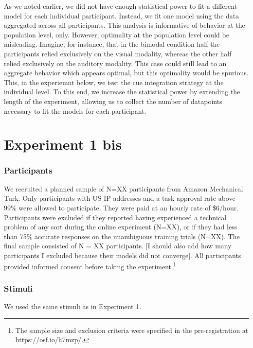 \documentclass[english,,man,floatsintext]{apa6}
\let\rmarkdownfootnote\footnote%
\def\footnote{\protect\rmarkdownfootnote}
\theoremstyle{definition}
\theoremstyle{definition}
\theoremstyle{definition}
\theoremstyle{remark}
\begin{document}
As we noted earlier, we did not have enough statistical power to fit a
different model for each individual participant. Instead, we fit one
model using the data aggregated across all participants. This analysis
is informative of behavior at the population level, only. However,
optimality at the population level could be misleading. Imagine, for
instance, that in the bimodal condition half the participants relied
exclusively on the visual modality, whereas the other half relied
exclusively on the auditory modality. This case could still lead to an
aggregate behavior which appears optimal, but this optimality would be
spurious. This, in the experiemnt below, we test the cue integration
strategy at the individual level. To this end, we increase the
statistical power by extending the length of the experiment, allowing us
to collect the number of datapoints necessary to fit the models for each
participant.

\section{Experiment 1 bis}\label{experiment-1-bis}

\subsubsection{Participants}\label{participants-1}

We recruited a planned sample of N=XX participants from Amazon
Mechanical Turk. Only participants with US IP addresses and a task
approval rate above 99\% were allowed to participate. They were paid at
an hourly rate of \$6/hour. Participants were excluded if they reported
having experienced a technical problem of any sort during the online
experiment (N=XX), or if they had less than 75\% accurate responses on
the unambiguous training trials (N=XX). The final sample consisted of N
= XX participants. {[}I should also add how many participants I excluded
because their models did not converge{]}. All participants provided
informed consent before taking the
experiment.\footnote{The sample size and exclusion criteria were specified in the pre-registration at https://osf.io/h7mzp/.}

\subsubsection{Stimuli}\label{stimuli-1}

We used the same stimuli as in Experiment 1.
\end{document}
